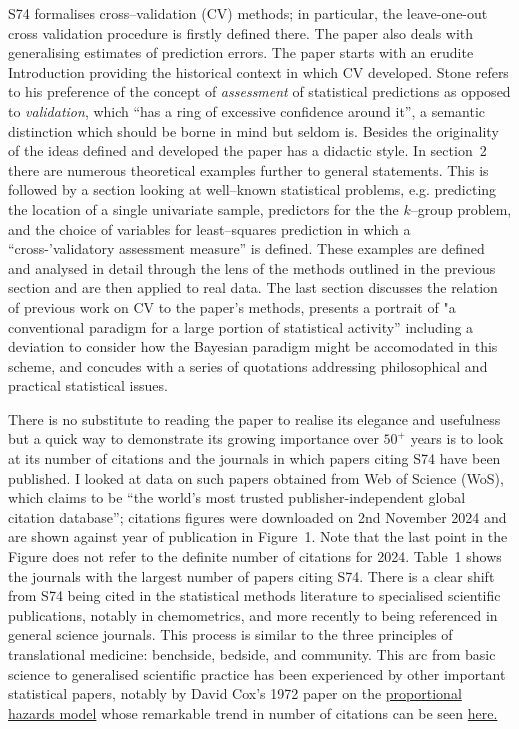 \documentclass[12pt]{article}  %
\begin{document}
S74 formalises cross--validation (CV) methods;  in particular, the leave-one-out cross validation procedure is firstly defined there.  The paper also deals with generalising estimates of prediction errors. The paper starts with an erudite Introduction providing the historical context in which CV developed.   Stone refers to his preference of the concept of \textit{assessment} of statistical predictions as opposed to \textit{validation}, which ``has a ring of excessive confidence around it'', a semantic distinction which should be borne in mind but seldom is.    Besides the originality of the ideas defined and developed 
the paper has a didactic style.   In section~2
there are numerous theoretical examples further to general statements.   This is followed by a section 
looking at well--known statistical problems, e.g.  predicting the location of a single univariate sample, predictors for the
the $k$--group problem,  and the 
choice of variables for least--squares prediction in which a ``cross-'validatory assessment measure'' is defined.
These examples are defined and analysed in detail through the lens of the methods outlined in the previous section and are then applied to real data.  
The last section discusses the relation of previous work on CV to  the paper's methods, presents a portrait of "a conventional paradigm for a large portion of statistical activity'' including a deviation to consider how the Bayesian paradigm might be accomodated in this scheme, and concudes with a series of quotations addressing philosophical and practical statistical issues.  

There is no substitute to reading the paper to realise its elegance and usefulness but a quick way to demonstrate its growing importance over $50^+$ years is to look at its number of citations and the journals in which papers citing S74 have been published.   I looked at data on such papers obtained from Web of Science (WoS), which claims to be “the world's most trusted publisher-independent global citation database”; 
citations figures were downloaded on 2nd November 2024 and are shown against year of publication 
in Figure~1.  Note that the last point in the Figure does not refer to the definite number of citations for 2024.
Table~1 shows the journals with the largest number of papers citing S74.  There is a clear shift from  S74 being cited in the statistical methods literature to specialised scientific publications, notably in chemometrics, and more recently to being referenced in general science journals.  This process is similar to the three principles of translational medicine: benchside, bedside, and community.  This arc from basic science to generalised scientific practice has been experienced by other important statistical papers, notably by David Cox's 
1972 paper on the \href{https://rss.onlinelibrary.wiley.com/doi/10.1111/j.2517-6161.1972.tb00899.x}
{proportional hazards model} whose remarkable trend in 
number of citations can be
seen  \href{https://rss.onlinelibrary.wiley.com/doi/full/10.1111/1740-9713.01634}{here.}
\end{document}
